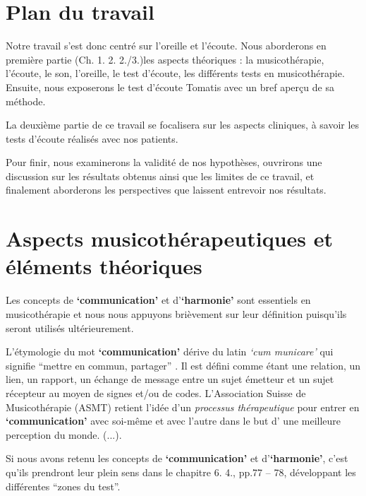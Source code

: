 
\section*{Plan du travail}

Notre travail s'est donc centré sur l'oreille et l'écoute.
Nous aborderons en première partie (Ch. 1. 2. 2./3.)les aspects théoriques : la musicothérapie, l'écoute, le son, l'oreille, le
test d'écoute, les différents tests en musicothérapie. Ensuite, nous
exposerons le test d'écoute Tomatis avec un bref aperçu de sa méthode.

La deuxième partie de ce travail se focalisera sur les aspects
cliniques, à savoir les tests d'écoute réalisés  avec  nos patients.

Pour finir, nous examinerons la validité de nos hypothèses, ouvrirons
une discussion sur les résultats obtenus ainsi que les limites de ce
travail, et finalement aborderons les perspectives que
laissent entrevoir nos résultats.



\section{{Aspects musicothérapeutiques et éléments théoriques}}






Les concepts de \textbf{`communication'} et  d'\textbf{`harmonie'}
sont essentiels en
musicothérapie et nous nous appuyons brièvement
sur leur définition puisqu'ils seront utilisés ultérieurement.


L'étymologie du mot  \textbf{`communication'} dérive du latin  \textit{`cum
  municare'} qui signifie ``mettre en commun, partager'' \autocite{dicpetitrobert}.
Il est défini comme étant une
relation, un lien, un rapport, un échange de message entre un sujet émetteur et un
sujet récepteur au moyen de signes et/ou de codes.
L'Association Suisse
de Musicothérapie (ASMT) retient l'idée d'un\textit{ processus thérapeutique }pour entrer en \textbf{`communication'} avec soi-même et avec
l'autre dans le but d' une meilleure perception du
monde. (...)\autocite{site_musitherapy}.

Si nous avons retenu les concepts de \textbf{`communication'} et d'\textbf{`harmonie'}, c'est qu'ils prendront leur plein sens
dans le chapitre 6. 4., pp.77 -- 78,  développant les différentes ``zones du test''.
